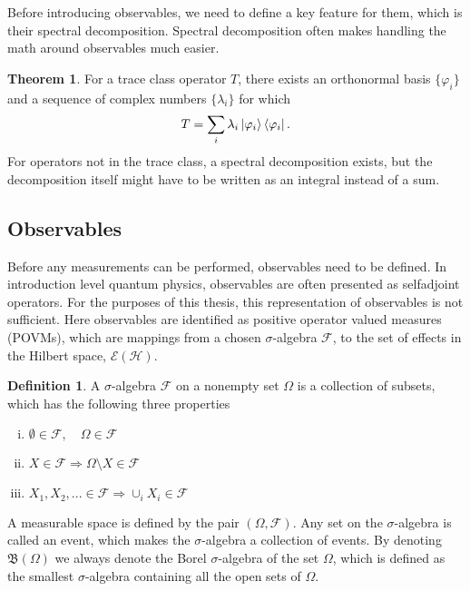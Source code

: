 \documentclass[a4paper,12pt]{wihuri}
\theoremstyle{definition}
\newtheorem{definition}{Definition}
\newtheorem{theorem}{Theorem}
\numberwithin{definition}{section}
\numberwithin{example}{section}
\numberwithin{theorem}{section}
\numberwithin{proposition}{section}
\numberwithin{lemma}{section}
\newcommand{\hi}{\mathcal{H}}%
\newcommand{\salg}{\mathcal{F}}%
\newcommand{\effect}{\mathcal{E}}%
\newcommand{\borel}{\mathfrak{B}}
\begin{document}
Before introducing observables, we need to define a key feature for them, which is their spectral decomposition. Spectral decomposition often makes handling the math around observables much easier.
\begin{theorem}
For a trace class operator $T$, there exists an orthonormal basis $\lbrace \varphi_i \rbrace$ and a sequence of complex numbers $\lbrace \lambda_i \rbrace$ for which
\begin{align*}
T = \sum_i \lambda_i \ket{\varphi_i}\bra{\varphi_i}\text{.}
\end{align*}
For operators not in the trace class, a spectral decomposition exists, but the decomposition itself might have to be written as an integral instead of a sum.
\end{theorem}

\subsection{Observables}
Before any measurements can be performed, observables need to be defined. In introduction level quantum physics, observables are often presented as selfadjoint operators. For the purposes of this thesis, this representation of observables is not sufficient. Here observables are identified as positive operator valued measures (POVMs), which are mappings from a chosen $\sigma$-algebra $\salg$, to the set of effects in the Hilbert space, $\effect(\hi)$. 
\begin{definition}
A $\sigma$-algebra $\salg$ on a nonempty set $\Omega$ is a collection of subsets, which has the following three properties
\begin{enumerate}[i)]
\item $\emptyset \in \salg, \quad \Omega \in \salg$
\item $X \in \salg \Rightarrow \Omega \setminus X \in \salg$
\item $X_1, X_2, ... \in \salg \Rightarrow \cup_i X_i \in \salg$
\end{enumerate} 
\end{definition}
A measurable space is defined by the pair $(\Omega, \salg)$. Any set on the $\sigma$-algebra is called an event, which makes the $\sigma$-algebra a collection of events. By denoting $\borel(\Omega)$ we always denote the Borel $\sigma$-algebra of the set $\Omega$, which is defined as the smallest $\sigma$-algebra containing all the open sets of $\Omega$\cite{rudin}.
\end{document}

